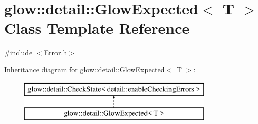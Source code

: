 \hypertarget{classglow_1_1detail_1_1_glow_expected}{}\section{glow\+:\+:detail\+:\+:Glow\+Expected$<$ T $>$ Class Template Reference}
\label{classglow_1_1detail_1_1_glow_expected}


{\ttfamily \#include $<$Error.\+h$>$}

Inheritance diagram for glow\+:\+:detail\+:\+:Glow\+Expected$<$ T $>$\+:\begin{figure}[H]
\begin{center}
\leavevmode
\includegraphics[height=2.000000cm]{classglow_1_1detail_1_1_glow_expected}
\end{center}
\end{figure}
